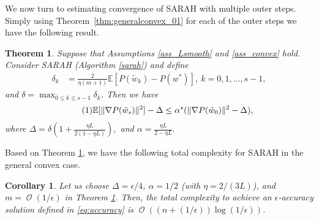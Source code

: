 \documentclass{article}
\newtheorem{thm}{Theorem}
\newtheorem{cor}{Corollary}
\newcommand{\new}[1]{\textcolor{red}{#1}}
\newcommand\tagthis{\addtocounter{equation}{1}\tag{\theequation}}
\DeclareMathOperator{\Ocal}{\mathcal{O}}
\begin{document}
We now turn to estimating convergence of SARAH with multiple outer steps. Simply using  Theorem~\ref{thm:generalconvex_01} for each of the outer steps we have the following result.
\begin{thm}\label{thm:generalconvex_02}
Suppose that Assumptions \ref{ass_Lsmooth} and \ref{ass_convex} hold. Consider SARAH (Algorithm \ref{sarah}) and define 
\begin{align*}
\delta_{k} &= \tfrac{2}{\eta(m+1)} \mathbb{E}[ P(\tilde{w}_{k}) - P(w^{*})], \ k = 0,1,\dots,s-1, 
\end{align*}
and $\delta = \max_{0 \leq k \leq s-1} \delta_{k}$. Then we have
\begin{align*}
\tagthis\label{asdfsfas}
\mathbb{E}[ \| \nabla P(\tilde{w}_s)\|^2 ] - \Delta  \leq \alpha^s ( \| \nabla P(\tilde{w}_0)\|^2 - \Delta),  
\end{align*}
where
$\Delta  = \delta\left(1 + \tfrac{\eta L}{2(1 - \eta L)} \right),$ and
$\alpha  = \tfrac{\eta L}{2 - \eta L}.$
\end{thm}
Based on Theorem \ref{thm:generalconvex_02}, we have the following total complexity for SARAH in the general convex case. 
\begin{cor}\label{cor:thm_3_complexity}
 Let us choose $\Delta = \epsilon/4$, $\alpha=1/2$ (with $\eta = 2/(3 L)$), and $m = \Ocal(1/\epsilon)$ in Theorem \ref{thm:generalconvex_02}. Then, the total complexity to achieve an $\epsilon$-accuracy solution defined in \eqref{eq:accuracy} is $\Ocal((n + (1/\epsilon))\log(1/\epsilon))$. 
\end{cor}
 
\end{document}
